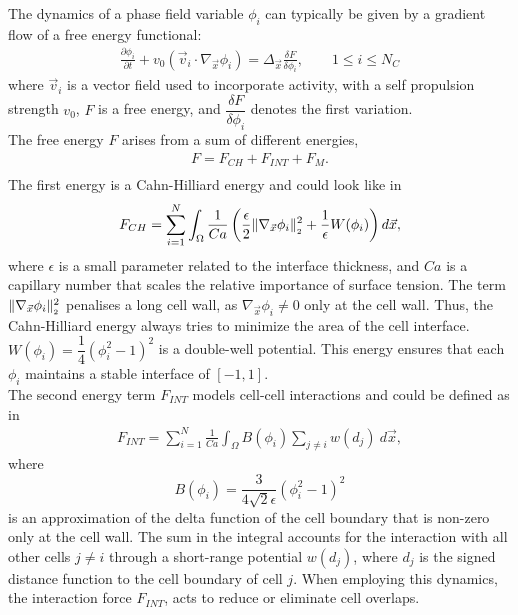 The dynamics of a phase field variable $\phi_i$ can typically be given by a gradient flow of a free energy functional:
\begin{align*}
	\frac{\partial \phi_i}{\partial t} + v_0 (\vec{v}_i \cdot \nabla_{\vec{x}} \phi_i) = \Delta_{\vec{x}} \frac{\delta F}{\delta \phi_i}, \qquad 1 \leq i \leq N_C 
\end{align*}
where $\vec{v}_i$ is a vector field used to incorporate activity, with a self propulsion strength $v_0$, $F$ is a free energy, and $\dfrac{\delta F}{\delta \phi_i}$ denotes the first variation.\\
The free energy $F$ arises from a sum of different energies, 
\begin{align*}
	F = F_{CH} + F_{INT} + F_{M}. \\
\end{align*}
The first energy is a Cahn-Hilliard energy and could look like in~\cite{wenzel2021}
\begin{align*} 
	F_{CH} = \sum\limits_{i=1}^N \int_{\Omega} \dfrac{1}{Ca} \left( \dfrac{\epsilon}{2} \norm[\nabla_{\vec{x}} \phi_i]^2 + \dfrac{1}{\epsilon} W(\phi_i) \right) d\vec{x},
\end{align*}
where $\epsilon$ is a small parameter related to the interface thickness, and $Ca$ is a capillary number that scales the relative importance of surface tension.
The term $\norm[\nabla_{\vec{x}} \phi_i]^2$ penalises a long cell wall, as $\nabla_{\vec{x}} \phi_i \neq 0$ only at the cell wall.
Thus, the Cahn-Hilliard energy always tries to minimize the area of the cell interface. \\
$W(\phi_i) = \dfrac{1}{4} (\phi_i^2 - 1)^2$ is a double-well potential. 
This energy ensures that each $\phi_i$ maintains a stable interface of $[-1,1]$.  \\ 
The second energy term $F_{INT}$ models cell-cell interactions and could be defined as in~\cite{wenzel2021}
\begin{align*}
	F_{INT} = \sum\limits_{i=1}^N \frac{1}{Ca} \int_{\Omega} B(\phi_i) \sum\limits_{j \neq i} w(d_j) \: d\vec{x},
\end{align*}
where 
\[B(\phi_i) = \dfrac{3}{4\sqrt{2}\epsilon} (\phi_i^2 - 1)^2\]
is an approximation of the delta function of the cell boundary that is non-zero only at the cell wall.
The sum in the integral accounts for the interaction with all other cells $j \neq i$ through a short-range potential $w(d_j)$, where $d_j$ is the signed distance function to the cell boundary of cell $j$.  
When employing this dynamics, the interaction force $F_{INT}$, acts to reduce or eliminate cell overlaps. \\
